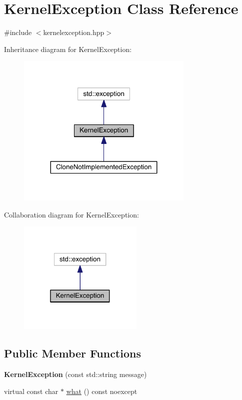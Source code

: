 \hypertarget{class_kernel_exception}{}\section{Kernel\+Exception Class Reference}
\label{class_kernel_exception}


{\ttfamily \#include $<$kernelexception.\+hpp$>$}



Inheritance diagram for Kernel\+Exception\+:
\nopagebreak
\begin{figure}[H]
\begin{center}
\leavevmode
\includegraphics[width=239pt]{class_kernel_exception__inherit__graph}
\end{center}
\end{figure}


Collaboration diagram for Kernel\+Exception\+:
\nopagebreak
\begin{figure}[H]
\begin{center}
\leavevmode
\includegraphics[width=169pt]{class_kernel_exception__coll__graph}
\end{center}
\end{figure}
\subsection*{Public Member Functions}
\begin{DoxyCompactItemize}
\item 
\hypertarget{class_kernel_exception_a58d532fc8c28dd48d8207f3904d34f2f}{}\label{class_kernel_exception_a58d532fc8c28dd48d8207f3904d34f2f} 
{\bfseries Kernel\+Exception} (const std\+::string message)
\item 
virtual const char $\ast$ \hyperlink{class_kernel_exception_a09317e64fd4bd4244df6fb7d687b609b}{what} () const noexcept
\end{DoxyCompactItemize}


